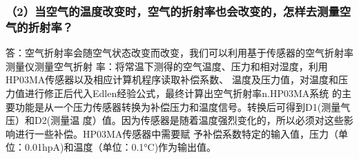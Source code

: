 \documentclass[12pt,a4paper,UTF8]{ctexart}
\begin{document}
\subsubsection*{（2）当空气的温度改变时，空气的折射率也会改变的，怎样去测量空气的折射率？}
答：空气折射率会随空气状态改变而改变，我们可以利用基于传感器的空气折射率测量仪测量空气折射
率：将常温下测得的空气温度、压力和相对湿度，利用HP03MA传感器以及相应计算机程序读取补偿系数、
温度及压力值，对温度和压力值进行修正后代入Edlen经验公式，最终计算出空气折射率n.HP03MA系统
的主要功能是从一个压力传感器转换为补偿压力和温度信号。转换后可得到D1(测量气压）和D2(测量温
度）值。因为传感器是随着温度强烈变化的，所以必须对这些影响进行一些补偿。HP03MA传感器中需要赋
予补偿系数特定的输入值，压力（单位：0.01hpA)和温度（单位：0.1°C)作为输出值。
\end{document}
